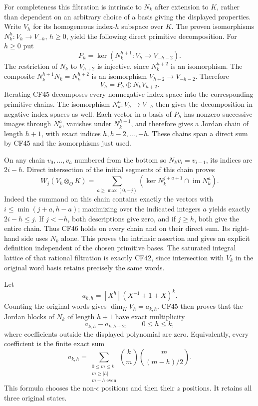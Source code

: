 For completeness this filtration is intrinsic to \(N_k\) after extension to \(K\), rather than dependent on an arbitrary choice of a basis giving the displayed properties. Write \(V_h\) for its homogeneous index-\(h\) subspace over \(K\). The proven isomorphisms \(N_k^h:V_h\to V_{-h}\), \(h\geq0\), yield the following direct primitive decomposition. For \(h\geq0\) put
\[
 P_h=\ker(N_k^{h+1}:V_h\longrightarrow V_{-h-2}).
\]
The restriction of \(N_k\) to \(V_{h+2}\) is injective, since \(N_k^{h+2}\) is an isomorphism. The composite \(N_k^{h+1}N_k=N_k^{h+2}\) is an isomorphism \(V_{h+2}\to V_{-h-2}\). Therefore
\[
 V_h=P_h\oplus N_kV_{h+2}.
 \tag{CF45}
\]
Iterating CF45 decomposes every nonnegative index space into the corresponding primitive chains. The isomorphism \(N_k^h:V_h\to V_{-h}\) then gives the decomposition in negative index spaces as well. Each vector in a basis of \(P_h\) has nonzero successive images through \(N_k^h\), vanishes under \(N_k^{h+1}\), and therefore gives a Jordan chain of length \(h+1\), with exact indices \(h,h-2,\ldots,-h\). These chains span a direct sum by CF45 and the isomorphisms just used.

On any chain \(v_0,\ldots,v_h\) numbered from the bottom so \(N_kv_i=v_{i-1}\), its indices are \(2i-h\). Direct intersection of the initial segments of this chain proves
\[
 W_j(V_k\otimes_OK)=
 \sum_{a\geq\max(0,-j)}
 \left(\ker N_k^{j+a+1}\cap\operatorname{im}N_k^a\right).
 \tag{CF46}
\]
Indeed the summand on this chain contains exactly the vectors with \(i\leq\min(j+a,h-a)\); maximizing over the indicated integers \(a\) yields exactly \(2i-h\leq j\). If \(j<-h\), both descriptions give zero, and if \(j\geq h\), both give the entire chain. Thus CF46 holds on every chain and on their direct sum. Its right-hand side uses \(N_k\) alone. This proves the intrinsic assertion and gives an explicit definition independent of the chosen primitive bases. The saturated integral lattice of that rational filtration is exactly CF42, since intersection with \(V_k\) in the original word basis retains precisely the same words.

Let
\[
 a_{k,h}=[X^h](X^{-1}+1+X)^k.
\]
Counting the original words gives \(\dim_KV_h=a_{k,h}\). CF45 then proves that the Jordan blocks of \(N_k\) of length \(h+1\) have exact multiplicity
\[
 a_{k,h}-a_{k,h+2},\qquad0\leq h\leq k,
 \tag{CF47}
\]
where coefficients outside the displayed polynomial are zero. Equivalently, every coefficient is the finite exact sum
\[
 a_{k,h}=
 \sum_{\substack{0\leq m\leq k\\m\geq|h|\\m-h\text{ even}}}
 \binom km\binom m{(m-h)/2}.
 \tag{CF48}
\]
This formula chooses the non-\(\epsilon\) positions and then their \(z\) positions. It retains all three original states.


